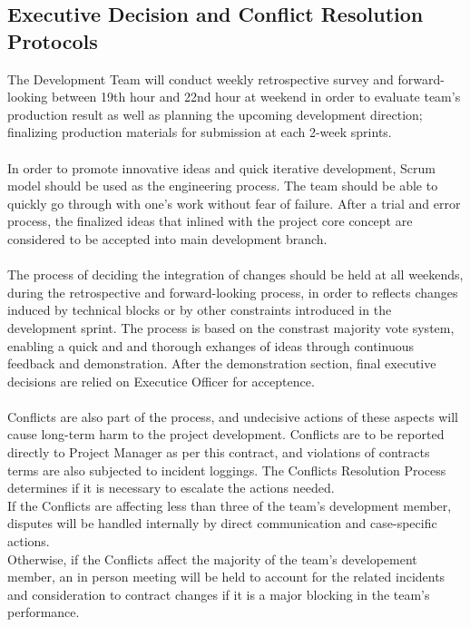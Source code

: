         \subsection{Executive Decision and Conflict Resolution Protocols}
        The Development Team will conduct weekly retrospective survey and forward-looking between 19th hour and 22nd hour at weekend 
        in order to evaluate team's production result as well as
        planning the upcoming development direction; finalizing production materials for submission at each 2-week sprints.
        \\\\
        In order to promote innovative ideas and quick iterative development, Scrum model should be used as the engineering process. The team should be able
        to quickly go through with one's work without fear of failure. After a trial and error process, the finalized ideas that inlined with the project core concept
        are considered to be accepted into main development branch. 
        \\\\
        The process of deciding the integration of changes should be held at all weekends, during the retrospective and forward-looking process, in order to reflects
        changes induced by technical blocks or by other constraints introduced in the development sprint. The process is based on the constrast majority vote system, 
        enabling a quick and and thorough exhanges of ideas through continuous feedback and demonstration. After the demonstration section, final executive decisions are
        relied on Executice Officer for acceptence.
        \\\\
        Conflicts are also part of the process, and undecisive actions of these aspects will cause long-term harm to the project development. Conflicts are to be reported
        directly to Project Manager as per this contract, and violations of contracts terms are also subjected to incident loggings. The Conflicts Resolution Process determines
        if it is necessary to escalate the actions needed.
        \\
        If the Conflicts are affecting less than three of the team's development member, disputes will be handled internally
        by direct communication and case-specific actions. 
        \\
        Otherwise, if the Conflicts affect the majority of the team's developement member, an in person meeting will be held
        to account for the related incidents and consideration to contract changes if it is a major blocking in the team's performance.

